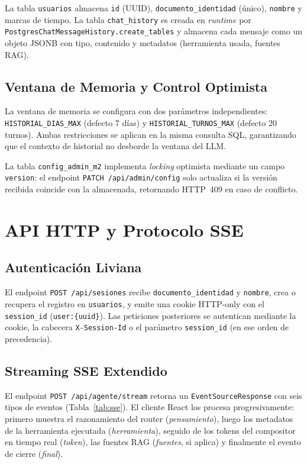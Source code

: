 \documentclass[conference]{IEEEtran}
\newcommand{\code}[1]{\texttt{\small #1}}
\begin{document}
La tabla \code{usuarios} almacena \code{id} (UUID), \code{documento\_identidad}
(único), \code{nombre} y marcas de tiempo. La tabla \code{chat\_history} es
creada en \textit{runtime} por \code{PostgresChatMessageHistory.create\_tables}
y almacena cada mensaje como un objeto JSONB con tipo, contenido y metadatos
(herramienta usada, fuentes RAG).

\subsection{Ventana de Memoria y Control Optimista}

La ventana de memoria se configura con dos parámetros independientes:
\code{HISTORIAL\_DIAS\_MAX} (defecto 7 días) y \code{HISTORIAL\_TURNOS\_MAX}
(defecto 20 turnos). Ambas restricciones se aplican en la misma consulta SQL,
garantizando que el contexto de historial no desborde la ventana del LLM.

La tabla \code{config\_admin\_m2} implementa \textit{locking} optimista
mediante un campo \code{version}: el endpoint \code{PATCH /api/admin/config}
solo actualiza si la versión recibida coincide con la almacenada, retornando
HTTP~409 en caso de conflicto.

\section{API HTTP y Protocolo SSE}
\label{sec:api}

\subsection{Autenticación Liviana}

El endpoint \code{POST /api/sesiones} recibe \code{documento\_identidad} y
\code{nombre}, crea o recupera el registro en \code{usuarios}, y emite una
cookie HTTP-only con el \code{session\_id} (\code{user:\{uuid\}}). Las
peticiones posteriores se autentican mediante la cookie, la cabecera
\code{X-Session-Id} o el parámetro \code{session\_id} (en ese orden de
precedencia).

\subsection{Streaming SSE Extendido}

El endpoint \code{POST /api/agente/stream} retorna un \code{EventSourceResponse}
con seis tipos de eventos (Tabla~\ref{tab:sse}). El cliente React los procesa
progresivamente: primero muestra el razonamiento del router (\textit{pensamiento}),
luego los metadatos de la herramienta ejecutada (\textit{herramienta}), seguido
de los tokens del compositor en tiempo real (\textit{token}), las fuentes RAG
(\textit{fuentes}, si aplica) y finalmente el evento de cierre (\textit{final}).
\end{document}
